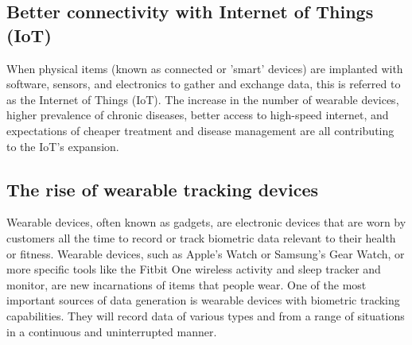 \documentclass[12pt]{article}
\begin{document}
\subsection{Better connectivity with Internet of Things (IoT)}
When physical items (known as connected or 'smart' devices) are implanted with software, sensors, and electronics to gather and exchange data, this is referred to as the Internet of Things (IoT). The increase in the number of wearable devices, higher prevalence of chronic diseases, better access to high-speed internet, and expectations of cheaper treatment and disease management are all contributing to the IoT's expansion.
\\
\subsection{The rise of wearable tracking devices}
Wearable devices, often known as gadgets, are electronic devices that are worn by customers all the time to record or track biometric data relevant to their health or fitness. Wearable devices, such as Apple's Watch or Samsung's Gear Watch, or more specific tools like the Fitbit One wireless activity and sleep tracker and monitor, are new incarnations of items that people wear. One of the most important sources of data generation is wearable devices with biometric tracking capabilities. They will record data of various types and from a range of situations in a continuous and uninterrupted manner.
\end{document}
